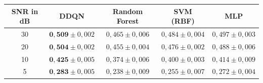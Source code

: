 \begin{tabular}{ccccc}
	\toprule
	\textbf{SNR in dB} & \textbf{DDQN} & \textbf{Random Forest} & \textbf{SVM (RBF)} & \textbf{MLP} \\
	\midrule
		30 & $\mathbf{0{,}509} \pm 0{,}002$ & $0{,}465 \pm 0{,}006$ & $0{,}484 \pm 0{,}004$ & $0{,}497 \pm 0{,}003$ \\
		20 & $\mathbf{0{,}504} \pm 0{,}002$ & $0{,}455 \pm 0{,}004$ & $0{,}476 \pm 0{,}002$ & $0{,}488 \pm 0{,}006$ \\
		10 & $\mathbf{0{,}425} \pm 0{,}005$ & $0{,}374 \pm 0{,}006$ & $0{,}400 \pm 0{,}003$ & $0{,}414 \pm 0{,}009$ \\
		5 & $\mathbf{0{,}283} \pm 0{,}005$ & $0{,}238 \pm 0{,}009$ & $0{,}255 \pm 0{,}007$ & $0{,}272 \pm 0{,}004$ \\
	\bottomrule
\end{tabular}
